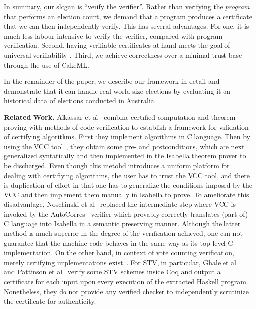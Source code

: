 \documentclass{llncs}
\begin{document}
In summary, our slogan is ``verify the verifier''. Rather than
verifying the \emph{program} that performs an election count, we
demand that a program produces a certificate that we can then
independently verify. This has several advantages. For one, it is
much less labour intensive to verify the verifier, compared with
program verification. Second, having verifiable certificates at hand
meets the goal of universal verifiability \cite{Kremer:2010:EVE}.
Third, we achieve correctness over a minimal trust base through the
use of CakeML. 

In the remainder of the paper, we describe our framework in detail
and demonstrate that it can handle real-world size elections by
evaluating it on historical data of elections conducted in
Australia.



\noindent\textbf{Related Work.} Alkassar et al~\cite{EAlk} combine
certified computation and theorem proving with methods of code
verification to establish a framework for validation of certifying
algorithms. First they implement algorithms in C language. Then by
using the VCC tool~\cite{}, they obtain some pre- and
postconditions, which are next generalized syntatically and then
implemented in the Isabella theorem prover to be discharged. Even
though this metohd introduces a uniform platform for dealing with
certifiying algorithms, the user has to trust the VCC tool, and
there is duplication of effort in that one has to generalize the
conditions imposed by the VCC and then implement them manually in
Isabella to prove. To ameliorate this disadvantage, Noschinski et
al~\cite{LNos} replaced the intermediate step where VCC is invoked
by the AutoCorres~\cite{DGre} verifier which provably correctly
translates (part of) C language into Isabella in a semantic
preserving manner. Although the latter method is much superior in
the degree of the verification achieved, one can not guarantee that
the machine code behaves in the same way as its top-level C
implementation. On the other hand, in context of vote counting
verification, merely certifying implementations
exist~\cite{DPat,DPati,MKet}. For STV, in particular, Ghale et
al~\cite{MKet} and Pattinson et al~\cite{DPati} verify some STV
schemes inside Coq and output a certificate for each input upon
every execution of the extracted Haskell program. Nonetheless, they
do not provide any verified checker to independently scrutinize the
certificate for authenticity.  
\end{document}
